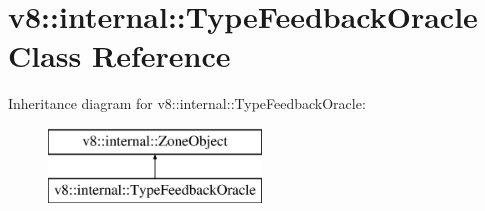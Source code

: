 \hypertarget{classv8_1_1internal_1_1_type_feedback_oracle}{}\section{v8\+:\+:internal\+:\+:Type\+Feedback\+Oracle Class Reference}
\label{classv8_1_1internal_1_1_type_feedback_oracle}
Inheritance diagram for v8\+:\+:internal\+:\+:Type\+Feedback\+Oracle\+:\begin{figure}[H]
\begin{center}
\leavevmode
\includegraphics[height=2.000000cm]{classv8_1_1internal_1_1_type_feedback_oracle}
\end{center}
\end{figure}
